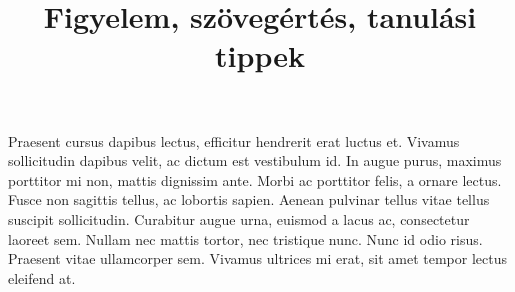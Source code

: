 \documentclass[../Main.tex]{subfiles}
\begin{document}
\title{Figyelem, szövegértés, tanulási tippek}

Praesent cursus dapibus lectus, efficitur hendrerit erat luctus et.
Vivamus sollicitudin dapibus velit, ac dictum est vestibulum id. 
In augue purus, maximus porttitor mi non, mattis dignissim ante.
Morbi ac porttitor felis, a ornare lectus. Fusce non sagittis tellus,
ac lobortis sapien. Aenean pulvinar tellus vitae tellus suscipit sollicitudin.
Curabitur augue urna, euismod a lacus ac, consectetur laoreet sem.
Nullam nec mattis tortor, nec tristique nunc. Nunc id odio risus.
Praesent vitae ullamcorper sem. Vivamus ultrices mi erat, sit amet
tempor lectus eleifend at.
\end{document}
